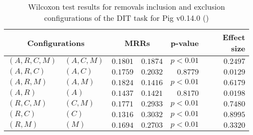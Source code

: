 
\begin{table}
\begin{spacing}{1.2}
\centering
\caption{Wilcoxon test results for removals inclusion and exclusion configurations of the DIT task for Pig v0.14.0 (\ctwo)}
\label{table:versus-wilcox-pig-dit-removals}
\begin{tabular}{ll|rr|rr}
\toprule
      \multicolumn{2}{c|}{Configurations} &                \multicolumn{2}{c|}{MRRs} &             p-value & Effect size \\
\midrule
 $(A,R,C,M)$ &  $(A,C,M)$ &       $0.1801$ &  $\bm{0.1874}$ & $p<0.01$ &    $0.2497$ \\
   $(A,R,C)$ &    $(A,C)$ &       $0.1759$ &  $\bm{0.2032}$ & $0.8779$ &    $0.0129$ \\
   $(A,R,M)$ &    $(A,M)$ &  $\bm{0.1824}$ &       $0.1416$ & $p<0.01$ &    $0.6179$ \\
     $(A,R)$ &      $(A)$ &  $\bm{0.1437}$ &       $0.1421$ & $0.8170$ &    $0.0198$ \\
   $(R,C,M)$ &    $(C,M)$ &       $0.1771$ &  $\bm{0.2933}$ & $p<0.01$ &    $0.7480$ \\
     $(R,C)$ &      $(C)$ &       $0.1316$ &  $\bm{0.3032}$ & $p<0.01$ &    $0.8995$ \\
     $(R,M)$ &      $(M)$ &       $0.1694$ &  $\bm{0.2703}$ & $p<0.01$ &    $0.3320$ \\
\bottomrule
\end{tabular}

\end{spacing}
\end{table}


